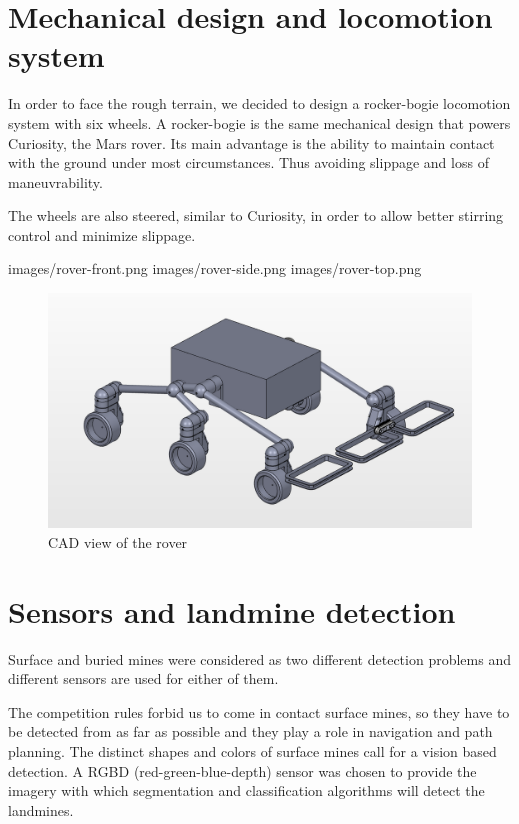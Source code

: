 \section{Mechanical design and locomotion system}
In order to face the rough terrain, we decided to design a rocker-bogie locomotion system with six wheels.
A rocker-bogie is the same mechanical design that powers Curiosity, the Mars rover.
Its main advantage is the ability to maintain contact with the ground under most circumstances.
Thus avoiding slippage and loss of maneuvrability.

The wheels are also steered, similar to Curiosity, in order to allow better stirring control and minimize slippage.

images/rover-front.png
images/rover-side.png
images/rover-top.png

\begin{figure}[htbp]
   \caption{\label{fig:rover} CAD view of the rover}
   \includegraphics[width=\textwidth]{images/rover}
\end{figure}

\section{Sensors and landmine detection}
Surface and buried mines were considered as two different detection problems and different sensors are used for either of them.

The competition rules forbid us to come in contact surface mines, so they have to be detected from as far as possible and they play a role in navigation and path planning.
The distinct shapes and colors of surface mines call for a vision based detection.
A RGBD (red-green-blue-depth) sensor was chosen to provide the imagery with which segmentation and classification algorithms will detect the landmines.


